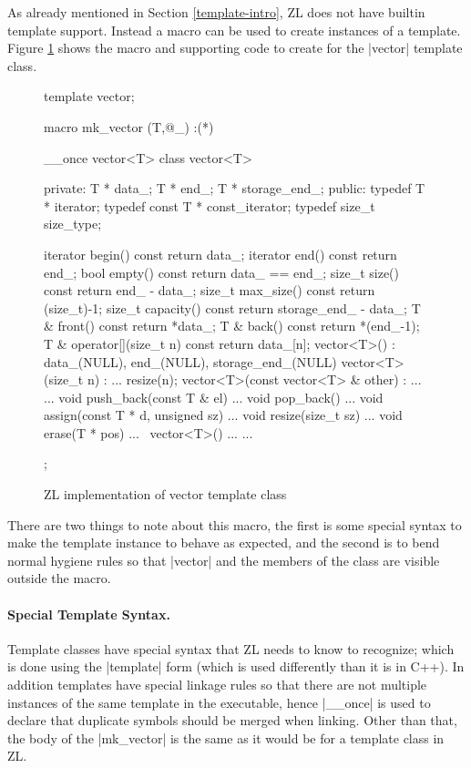 As already mentioned in Section \ref{template-intro}, ZL does not have builtin
template support.  Instead a macro can be used to create instances of
a template.  Figure \ref{vector-impl} shows the macro and supporting
code to create for the |vector| template class.
\begin{figure}
\begin{codef}
template vector;

macro mk_vector (T,@_) :(*)
{
  __once vector<T>
  class vector<T> {
  private:
    T * data_;
    T * end_;
    T * storage_end_;
  public:
    typedef T * iterator;
    typedef const T * const_iterator;
    typedef size_t size_type;

    iterator begin() const {return data_;}
    iterator end()   const {return end_;}
    bool empty() const {return data_ == end_;}
    size_t size() const {return end_ - data_;}
    size_t max_size() const {return (size_t)-1;}
    size_t capacity() const {return storage_end_ - data_;}
    T & front() const {return *data_;}
    T & back() const {return *(end_-1);}
    T & operator[](size_t n) const {return data_[n];}
    vector<T>() : data_(NULL), end_(NULL), storage_end_(NULL) {}
    vector<T>(size_t n) : ... {resize(n);}
    vector<T>(const vector<T> & other) : ... {...}
    void push_back(const T & el) {...}
    void pop_back() {...}
    void assign(const T * d, unsigned sz) {...}
    void resize(size_t sz) {...}
    void erase(T * pos) {...}
    ~vector<T>() {...}
    ...
  };
}
\end{codef}
\caption{ZL implementation of vector template class}
\label{vector-impl}
\end{figure}

There are two things to note about this macro, the first is some
special syntax to make the template instance to behave as expected,
and the second is to bend normal hygiene rules so that |vector| and the
members of the class are visible outside the macro.

\paragraph{Special Template Syntax.}

Template classes have special syntax that ZL needs to know to
recognize; which is done using the |template| form (which is used
differently than it is in C++).  In addition templates have special
linkage rules so that there are not multiple instances of the same
template in the executable, hence |__once| is used to declare that
duplicate symbols should be merged when linking.  Other than that, the
body of the |mk_vector| is the same as it would be for a template
class in ZL.

